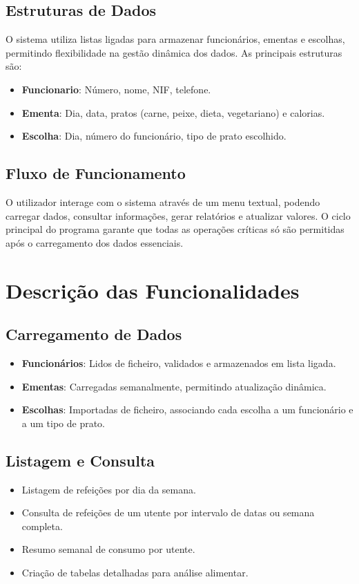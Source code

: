 \documentclass[a4paper,12pt]{report}
\begin{document}
\section{Estruturas de Dados}
O sistema utiliza listas ligadas para armazenar funcionários, ementas e escolhas, permitindo flexibilidade na gestão dinâmica dos dados. As principais estruturas são:
\begin{itemize}
    \item \textbf{Funcionario}: Número, nome, NIF, telefone.
    \item \textbf{Ementa}: Dia, data, pratos (carne, peixe, dieta, vegetariano) e calorias.
    \item \textbf{Escolha}: Dia, número do funcionário, tipo de prato escolhido.
\end{itemize}

\section{Fluxo de Funcionamento}
O utilizador interage com o sistema através de um menu textual, podendo carregar dados, consultar informações, gerar relatórios e atualizar valores. O ciclo principal do programa garante que todas as operações críticas só são permitidas após o carregamento dos dados essenciais.

\chapter{Descrição das Funcionalidades}
\section{Carregamento de Dados}
\begin{itemize}
    \item \textbf{Funcionários}: Lidos de ficheiro, validados e armazenados em lista ligada.
    \item \textbf{Ementas}: Carregadas semanalmente, permitindo atualização dinâmica.
    \item \textbf{Escolhas}: Importadas de ficheiro, associando cada escolha a um funcionário e a um tipo de prato.
\end{itemize}

\section{Listagem e Consulta}
\begin{itemize}
    \item Listagem de refeições por dia da semana.
    \item Consulta de refeições de um utente por intervalo de datas ou semana completa.
    \item Resumo semanal de consumo por utente.
    \item Criação de tabelas detalhadas para análise alimentar.
\end{itemize}
\end{document}
